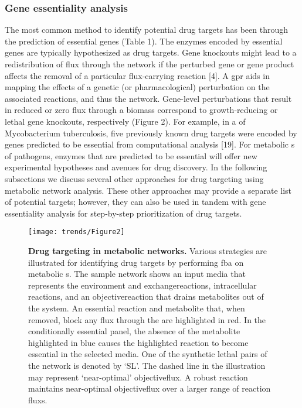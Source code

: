 \subsubsection{Gene essentiality analysis}
The most common method to identify potential drug targets has been 
through the prediction of essential genes (Table 1). The enzymes 
encoded by essential genes are typically hypothesized as drug targets. 
Gene knockouts might lead to a redistribution of \gls{flux} through the 
network if the perturbed gene or gene product affects the removal 
of a particular \gls{flux}-carrying reaction [4]. A \gls{gpr} aids in mapping 
the effects of a genetic (or pharmacological) perturbation on the 
associated reactions, and thus the network. Gene-level perturbations 
that result in reduced or zero \gls{flux} through a \gls{biomass} 
correspond to growth-reducing or lethal gene knockouts, 
respectively (Figure 2). For example, in a  of 
Mycobacterium tuberculosis, five previously known drug targets 
were encoded by genes predicted to be essential from computational 
analysis [19]. For metabolic s of pathogens, 
enzymes that are predicted to be essential will offer new 
experimental hypotheses and avenues for drug discovery. In the 
following subsections we discuss several other approaches for 
drug targeting using metabolic network analysis. These other 
approaches may provide a separate list of potential 
targets; however, they can also be used in tandem with 
gene essentiality analysis for step-by-step prioritization 
of drug targets.

\begin{figure}[h!]
  \centering
  \texttt{[image: trends/Figure2]}
  \caption[Drug targeting in metabolic networks]{
       \textbf{Drug targeting in metabolic networks.}
       Various strategies are illustrated for identifying drug 
       targets by performing \gls{fba} on metabolic s. 
       The sample network shows an input media that represents 
       the environment and \glspl{exchangereaction}, intracellular 
       reactions, and an \gls{objectivereaction} that drains metabolites 
       out of the system. An essential reaction and metabolite 
       that, when removed, block any \gls{flux} through the  
       are highlighted in red. In the conditionally essential 
       panel, the absence of the metabolite highlighted in blue 
       causes the highlighted reaction to become essential in 
       the selected media. One of the synthetic lethal pairs 
       of the network is denoted by `SL'. The dashed line in 
       the  illustration may represent `near-optimal'
       \gls{objectiveflux}. A robust reaction maintains near-optimal 
       \gls{objectiveflux} over a larger range of reaction \glspl{flux}.
  }
  \label{trends:fig2}
\end{figure}

